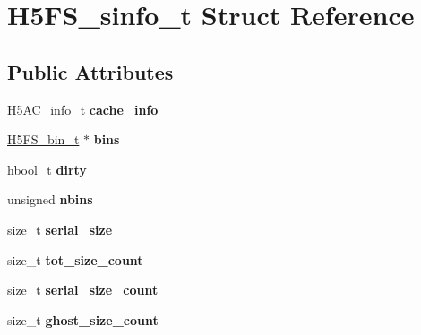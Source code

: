 \hypertarget{struct_h5_f_s__sinfo__t}{}\section{H5\+F\+S\+\_\+sinfo\+\_\+t Struct Reference}
\label{struct_h5_f_s__sinfo__t}
\subsection*{Public Attributes}
\begin{DoxyCompactItemize}
\item 
\mbox{\label{struct_h5_f_s__sinfo__t_a60bc2a70f181057785e71b1ef05c90d5}} 
H5\+A\+C\+\_\+info\+\_\+t {\bfseries cache\+\_\+info}
\item 
\mbox{\label{struct_h5_f_s__sinfo__t_acab4a7127dd0616f069e98794e40be08}} 
\hyperlink{struct_h5_f_s__bin__t}{H5\+F\+S\+\_\+bin\+\_\+t} $\ast$ {\bfseries bins}
\item 
\mbox{\label{struct_h5_f_s__sinfo__t_abaaac4b74e5cb07f41a969a5c2340c31}} 
hbool\+\_\+t {\bfseries dirty}
\item 
\mbox{\label{struct_h5_f_s__sinfo__t_ac66b7ed984cd89ca8e82f5aee3979f12}} 
unsigned {\bfseries nbins}
\item 
\mbox{\label{struct_h5_f_s__sinfo__t_ad42f25f5959e98e540b7d5642aeee000}} 
size\+\_\+t {\bfseries serial\+\_\+size}
\item 
\mbox{\label{struct_h5_f_s__sinfo__t_a44624fdcf33c91bc1b159a08411630b5}} 
size\+\_\+t {\bfseries tot\+\_\+size\+\_\+count}
\item 
\mbox{\label{struct_h5_f_s__sinfo__t_a88e4124f4347cef57cd7ab45b860e42e}} 
size\+\_\+t {\bfseries serial\+\_\+size\+\_\+count}
\item 
\mbox{\label{struct_h5_f_s__sinfo__t_a36638aa75062018e56d60f32b248fd7a}} 
size\+\_\+t {\bfseries ghost\+\_\+size\+\_\+count}
\item 
\mbox{\label{struct_h5_f_s__sinfo__t_aa39618e7bc817e7af492da41363edeff}} 

\end{DoxyCompactItemize}
